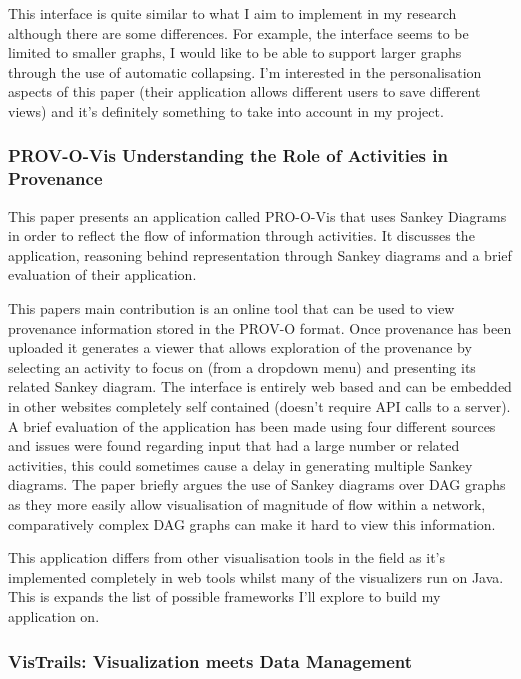 This interface is quite similar to what I aim to implement in my research although there are some differences. For example, the interface seems to be limited to smaller graphs, I would like to be able to support larger graphs through the use of automatic collapsing. I'm interested in the personalisation aspects of this paper (their application allows different users to save different views) and it's definitely something to take into account in my project.


\subsubsection{PROV-O-Vis Understanding the Role of Activities in Provenance\cite{Hoekstra2014}}
\label{sub:prov_o_vis_understanding_the_role_of_activities_in_provenance}

This paper presents an application called PRO-O-Vis that uses Sankey Diagrams in order to reflect the flow of information through activities. It discusses the application, reasoning behind representation through Sankey diagrams and a brief evaluation of their application.

This papers main contribution is an online tool that can be used to view provenance information stored in the PROV-O format. Once provenance has been uploaded it generates a viewer that allows exploration of the provenance by selecting an activity to focus on (from a dropdown menu) and presenting its related Sankey diagram. The interface is entirely web based and can be embedded in other websites completely self contained (doesn't require API calls to a server). A brief evaluation of the application has been made using four different sources and issues were found regarding input that had a large number or related activities, this could sometimes cause a delay in generating multiple Sankey diagrams. The paper briefly argues the use of Sankey diagrams over DAG graphs as they more easily allow visualisation of magnitude of flow within a network, comparatively complex DAG graphs can make it hard to view this information.

This application differs from other visualisation tools in the field as it's implemented completely in web tools whilst many of the visualizers run on Java. This is expands the list of possible frameworks I'll explore to build my application on.

\subsubsection{VisTrails: Visualization meets Data Management\cite{Callahan2006}}
\label{sub:vistrails_visualization_meets_data_management}


